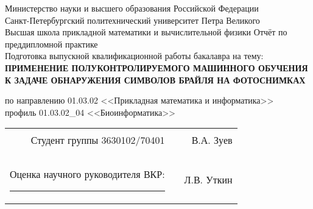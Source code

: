 \documentclass{main.tex}[subfiles]
\begin{document}
\begin{titlepage}
\begin{center}
    Министерство науки и высшего образования Российской Федерации \\
    Санкт-Петербургский политехнический университет Петра Великого \\
    Высшая школа прикладной математики и вычислительной физики
    \vfill
    Отчёт по преддипломной практике\\
    Подготовка выпускной квалификационной работы бакалавра на тему:\\
    \vspace{.7\baselineskip}
    \large{\textbf{
            ПРИМЕНЕНИЕ ПОЛУКОНТРОЛИРУЕМОГО МАШИННОГО ОБУЧЕНИЯ
            К ЗАДАЧЕ ОБНАРУЖЕНИЯ СИМВОЛОВ БРАЙЛЯ НА ФОТОСНИМКАХ}}
\end{center}
\begin{center}
по направлению 01.03.02 <<Прикладная математика и информатика>> \\
профиль 01.03.02\_04 <<Биоинформатика>>
\end{center}

\vfill

\begin{tabular}{ rrr }
	Студент группы 3630102/70401 & \rule{3cm}{0.15mm} & В.А. Зуев\\
	&&\\
	Оценка научного руководителя ВКР: \rule{1cm}{0.15mm}  & \rule{3cm}{0.15mm} &  Л.В. Уткин\\
\end{tabular}


\vfill

\end{titlepage}
\end{document}

